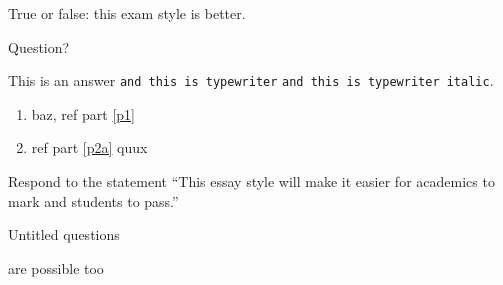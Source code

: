 \documentclass{gsexam}
\begin{document}
\begin{bscexam}[fifteen]


\coverpage

\begin{part}{1}{1}{40}

\begin{question}{40}
  True or false: this exam style is better.  
\end{question}
\end{part}

\begin{part}{3}{2}{60}

\begin{question}{25}
\item \label{p1} Question? 
  \begin{answer}
  This is an answer {\tt and this is typewriter} \texttt{and this is
    typewriter italic}.
\end{answer}
\item 
  \begin{enumerate}
  \item \label{p2a} baz, ref part \ref{p1} 
  \item ref part \ref{p2a} quux 
  \end{enumerate}
\end{question}
\begin{question}{30}
  Respond to the statement ``This essay style will make it easier for
  academics to mark and students to pass.'' 
\end{question}
\begin{question}{25}
\item Untitled questions 
\item are possible too 
\end{question}

\end{part}

\end{bscexam}
\end{document}
